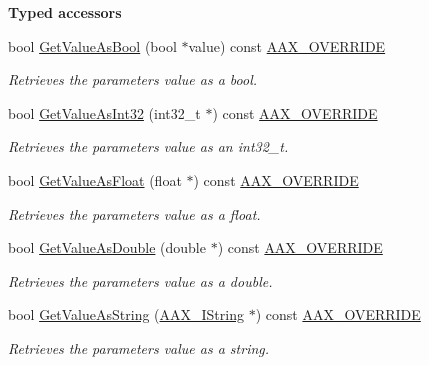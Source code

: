 \begin{Indent}\textbf{ Typed accessors}\par
\begin{DoxyCompactItemize}
\item 
bool \mbox{\hyperlink{a01541_ae28486d2b97c869b7626e5d57ca783df}{Get\+Value\+As\+Bool}} (bool $\ast$value) const \mbox{\hyperlink{a00392_ac2f24a5172689ae684344abdcce55463}{A\+A\+X\+\_\+\+O\+V\+E\+R\+R\+I\+DE}}
\begin{DoxyCompactList}\small\item\em Retrieves the parameter\textquotesingle{}s value as a bool. \end{DoxyCompactList}\item 
bool \mbox{\hyperlink{a01541_a198b595497ef9e04a56b212a94b6150a}{Get\+Value\+As\+Int32}} (int32\+\_\+t $\ast$) const \mbox{\hyperlink{a00392_ac2f24a5172689ae684344abdcce55463}{A\+A\+X\+\_\+\+O\+V\+E\+R\+R\+I\+DE}}
\begin{DoxyCompactList}\small\item\em Retrieves the parameter\textquotesingle{}s value as an int32\+\_\+t. \end{DoxyCompactList}\item 
bool \mbox{\hyperlink{a01541_a8d925887f2c4ea3b6d06e077c06fc01f}{Get\+Value\+As\+Float}} (float $\ast$) const \mbox{\hyperlink{a00392_ac2f24a5172689ae684344abdcce55463}{A\+A\+X\+\_\+\+O\+V\+E\+R\+R\+I\+DE}}
\begin{DoxyCompactList}\small\item\em Retrieves the parameter\textquotesingle{}s value as a float. \end{DoxyCompactList}\item 
bool \mbox{\hyperlink{a01541_afecb7c86751c21230ba6e049aa70a19a}{Get\+Value\+As\+Double}} (double $\ast$) const \mbox{\hyperlink{a00392_ac2f24a5172689ae684344abdcce55463}{A\+A\+X\+\_\+\+O\+V\+E\+R\+R\+I\+DE}}
\begin{DoxyCompactList}\small\item\em Retrieves the parameter\textquotesingle{}s value as a double. \end{DoxyCompactList}\item 
bool \mbox{\hyperlink{a01541_ac3e4ee150fd49f1ebd934d4269a1aad1}{Get\+Value\+As\+String}} (\mbox{\hyperlink{a01873}{A\+A\+X\+\_\+\+I\+String}} $\ast$) const \mbox{\hyperlink{a00392_ac2f24a5172689ae684344abdcce55463}{A\+A\+X\+\_\+\+O\+V\+E\+R\+R\+I\+DE}}
\begin{DoxyCompactList}\small\item\em Retrieves the parameter\textquotesingle{}s value as a string. \end{DoxyCompactList}\item 

\end{DoxyCompactItemize}
\end{Indent}
